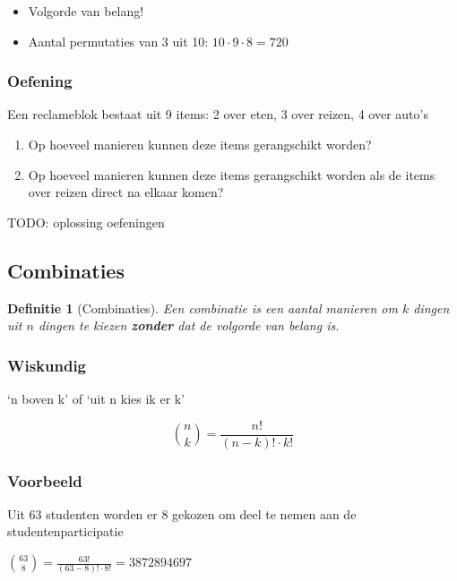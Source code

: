 \documentclass{article}
\newtheorem{theorem}{Definitie}[section]
\begin{document}
\begin{itemize}
    \item Volgorde van belang!
    \item Aantal permutaties van 3 uit 10: $10 \cdot 9 \cdot 8 = 720$
\end{itemize}

\subsubsection{Oefening}

Een reclameblok bestaat uit 9 items: 2 over eten, 3 over reizen, 4 over auto's

\begin{enumerate}
    \item Op hoeveel manieren kunnen deze items gerangschikt worden?
    \item Op hoeveel manieren kunnen deze items gerangschikt worden als de items over reizen direct na elkaar komen?
\end{enumerate}

TODO: oplossing oefeningen

\subsection{Combinaties}

\begin{theorem}[Combinaties]
    Een combinatie is een aantal manieren om $k$ dingen uit $n$ dingen te kiezen \textbf{zonder} dat de volgorde van belang is.
\end{theorem}

\subsubsection{Wiskundig}

`n boven k' of `uit n kies ik er k'

\begin{equation}
    \binom{n}{k} = \frac{n!}{(n-k)! \cdot k!}
\end{equation}

\subsubsection{Voorbeeld}

Uit 63 studenten worden er 8 gekozen om deel te nemen aan de studentenparticipatie

$\binom{63}{8} = \frac{63!}{(63-8)! \cdot 8!} = 3 872 894 697$
\end{document}
